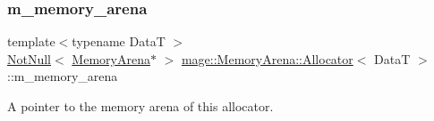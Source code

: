 \subsubsection{\texorpdfstring{m\+\_\+memory\+\_\+arena}{m\_memory\_arena}}
{\footnotesize\ttfamily template$<$typename DataT $>$ \\
\mbox{\hyperlink{namespacemage_a8769f9d670d6b585ea306cb1062af94b}{Not\+Null}}$<$ \mbox{\hyperlink{classmage_1_1_memory_arena}{Memory\+Arena}}$\ast$ $>$ \mbox{\hyperlink{classmage_1_1_memory_arena_1_1_allocator}{mage\+::\+Memory\+Arena\+::\+Allocator}}$<$ DataT $>$\+::m\+\_\+memory\+\_\+arena\hspace{0.3cm}{\ttfamily [private]}}

A pointer to the memory arena of this allocator. 